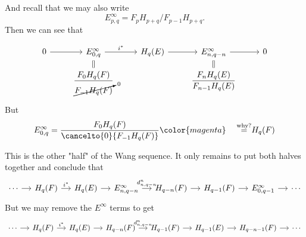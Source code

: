 And recall that we may also write
\[E^\infty_{p,q}=F_pH_{p+q}/F_{p-1}H_{p+q}.\]
Then we can see that
\iffalse\[\begin{tikzcd}[row sep=small]
	0\arrow[r]&E^\infty_{0,p+n-1}\arrow[d,equal]\arrow[r]&H_{p+n-1}(E)\arrow[r]&E^\infty_{n,q-1}\arrow[r]\arrow[d,equal]&0\\
		  &\dfrac{F_0H_{p+n-1}(F)}{\cancelto{0}{F_{-1}H_{p+n-1}(F)}} &&\dfrac{F_nH_{p+n-1}}{F_{n-1}H_{p+n-1}}
\end{tikzcd}\]\fi
\[\begin{tikzcd}[row sep=small]
	0\arrow[r]&E^\infty_{0,q}\arrow[d,equal]\arrow[r,"i^*"]&H_{q}(E)\arrow[r]&E^\infty_{n,q-n}\arrow[r]\arrow[d,equal]&0\\
		  &\dfrac{F_0H_{q}(F)}{\cancelto{0}{F_{-1}H_{q}(F)}} &&\dfrac{F_nH_{q}(E)}{F_{n-1}H_{q}(E)}
\end{tikzcd}\]
But 
\[E^\infty_{0,q}=\dfrac{F_0H_{q}(F)}{\cancelto{0}{F_{-1}H_{q}(F)}}{\color{magenta}\quad \overset{\text{why?}}{=}}H_{q}(F)\]
\iffalse
	these groups are just {\color{magenta}(why?)}
\[\begin{tikzcd}[row sep=small]
	0\arrow[r]&E^\infty_{0,q}\arrow[d,equal,magenta]\arrow[r]&H_{q}(E)\arrow[r]\arrow[d,equal]&E^\infty_{n,q-n}\arrow[r]\arrow[d,equal,magenta]&0\\
	0\arrow[r]&H_q(F)\arrow[r]&H_{q}(E)\arrow[r]&H_{q-n}(F)\arrow[r]&0
\end{tikzcd}\]\fi
This is the other "half" of the Wang sequence. It only remains to put both halves together and conclude that
\[\begin{tikzcd}[column sep=small]
	\cdots\arrow[r]&H_{q}(F)\arrow[r,"i^*"]&H_{q}(E)\arrow[r]&E^{\infty}_{n,q-n}\arrow[r,"d^n_{n,q-n}"]&H_{q-n}(F)\arrow[r]&H_{q-1}(F)\arrow[r]&E^\infty_{0,q-1}\arrow[r]&\cdots
\end{tikzcd}\]
But we may remove the $E^\infty$ terms to get
\[\begin{tikzcd}[column sep=small]
	\cdots\arrow[r]&H_{q}(F)\arrow[r,"i^*"]&H_{q}(E)\arrow[r]&H_{q-n}(F)\arrow[r,"d^n_{n,q-n}"]&H_{q-1}(F)\arrow[r]&H_{q-1}(E)\arrow[r]&H_{q-n-1}(F)\arrow[r]&\cdots
\end{tikzcd}\]
